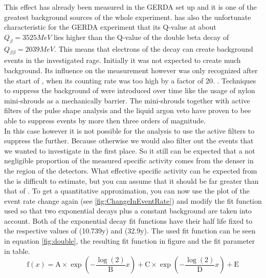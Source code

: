 \documentclass[encoding=utf8,british]{tumphthesis}
\begin{document}
This effect has already been measured in the GERDA set up and it is one of the greatest background sources of the whole experiment.
 has also the unfortunate characteristic for the GERDA experiment that its Q-value at about $Q_{\beta}=3525\unit{MeV}$ lies higher than the Q-value of the double beta decay of  $Q_{\beta \beta} = 2039\unit{MeV}$.
This means that electrons of the  decay can create background events in the investigated rage. 
Initially it was not expected to create much background.
Its influence on the measurement however was only recognized after the start of \PI, when its counting rate was too high by a factor of 20. \cite{becerici_schmidt_results_2014}. %
Techniques to suppress the background of  were introduced over time like the usage of nylon mini-shrouds as a mechanically barrier.
The mini-shrouds together with active filters of the pulse shape analysis and the liquid argon veto have proven to bee able to suppress  events by more then three orders of magnitude.
\\

In this case however it is not possible for the analysis to use the active filters to suppress the  further.
Because otherwise we would also filter out the \Kr events that we wanted to investigate in the first place.
So it still can be expected that a not negligible proportion of the measured specific activity comes from the denser  in the region of the detectors.
What effective specific activity can be expected from the  is difficult to estimate, but you can assume that it should be far greater than that of \Kr.
To get a quantitative approximation, you can now use the plot of the event rate change again (see \ref{fig:ChangeInEventRate}) and modify the fit function used so that two exponential decays plus a constant background are taken into account.
Both of the exponential decay fit functions have their half life fixed to the respective values of \Kr (10.739y) and  (32.9y).
The used fit function can be seen in equation \ref{fig:double}, the resulting fit function in figure and the fit parameter in table.
\begin{equation}
    \mathrm{f}(x) = \mathrm{A}\times\exp\left(-\frac{\log(2)}{\mathrm{B}} x \right) + \mathrm{C}\times\exp\left(-\frac{\log(2)}{\mathrm{D}} x \right) + \mathrm{E}
\end{equation}
\end{document}
